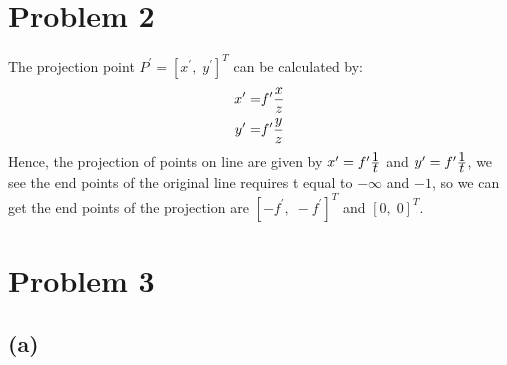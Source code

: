 \documentclass[letterpaper]{article}
\begin{document}
\hspace*{2em}
\section*{Problem 2}
The projection point $P^\prime = [x^\prime,\; y^\prime]^T$ can be calculated by:
\begin{align*}
	x^\prime = & f^\prime \frac{\displaystyle x}{\displaystyle z}\\
	y^\prime = & f^\prime \frac{\displaystyle y}{\displaystyle z}
\end{align*}
Hence, the projection of points on line are given by
$x^\prime = f^\prime \frac{\displaystyle 1}{\displaystyle t}$ and $y^\prime = f^\prime \frac{\displaystyle 1}{\displaystyle t}$, we see the end points of the original line requires t equal to $-\infty$ and $-1$, so we can get the end points of the projection are $[-f^\prime,\; -f^\prime]^T$ and $[0,\; 0]^T$.

\hspace*{2em}
\section*{Problem 3}
\subsection*{(a)}
\end{document}
